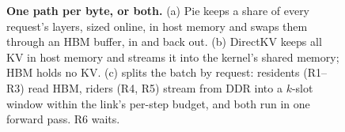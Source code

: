 \begin{figure}[t]
\caption{\textbf{One path per byte, or both.} (a) Pie keeps a share of every
request's layers, sized online, in host memory and swaps them through an HBM buffer, in
and back out. (b) DirectKV keeps all KV in host memory and streams it into the
kernel's shared memory; HBM holds no KV. (c) \sysname{} splits the batch by
request: residents (R1--R3) read HBM, riders (R4, R5) stream from DDR into a
$k$-slot window within the link's per-step budget, and both run in one forward
pass. R6 waits.}
\label{fig:tiers}
\end{figure}
